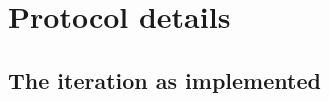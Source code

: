 %

\section{Protocol details}
\label{sec:app-protocols}

\subsection{The \WHIR{} iteration as implemented}
\label{sec:app-whir}

